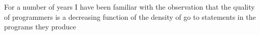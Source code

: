 
\begin{epigrafe}
  For a number of years I have been familiar with the observation that the quality of programmers is a decreasing function of the density of go to statements in the programs they produce \\
  \cite{dijkstra1968}
\end{epigrafe}

